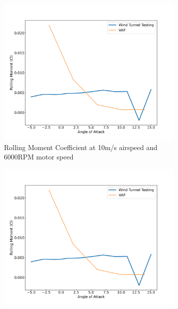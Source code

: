 \begin{figure}[H]
    \centering
    \begin{subfigure}[b]{0.467\textwidth}
        \centering
        \includegraphics[width=\textwidth]{05_Results/VAP/tractor/Cl/10ms_6000RPM_Cl.png}
        \caption{Rolling Moment Coefficient at 10m/s airspeed and 6000RPM motor speed}
        \label{fig:VAP_Cl_10ms_6000}
    \end{subfigure}
    \begin{subfigure}[b]{0.467\textwidth}
        \centering
        \includegraphics[width=\textwidth]{05_Results/VAP/tractor/Cl/10ms_6000RPM_Cl.png}

\end{subfigure}
\end{figure}
